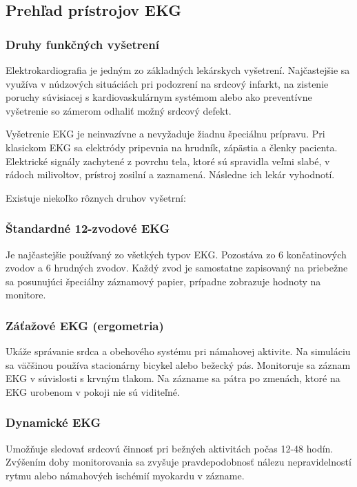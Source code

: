 \documentclass[titlepage]{article}
\begin{document}


\newpage 
\subsection{Prehľad prístrojov EKG}
\subsubsection{Druhy funkčných vyšetrení}
Elektrokardiografia je jedným zo základných lekárskych vyšetrení. Najčastejšie sa využíva v núdzových situáciách pri podozrení na srdcový infarkt, na zistenie poruchy súvisiacej s kardiovaskulárnym systémom alebo ako preventívne vyšetrenie so zámerom odhaliť možný srdcový defekt.

Vyšetrenie EKG je neinvazívne a nevyžaduje žiadnu špeciálnu prípravu. Pri klasickom EKG sa elektródy pripevnia na hrudník, zápästia a členky pacienta. Elektrické signály zachytené z povrchu tela, ktoré sú spravidla veľmi slabé, v rádoch milivoltov, prístroj zosilní a zaznamená. Následne ich lekár vyhodnotí.

Existuje niekoľko rôznych druhov vyšetrní:
\subsubsection*{Štandardné 12-zvodové EKG}
Je najčastejšie používaný zo všetkých typov EKG. Pozostáva zo 6 končatinových zvodov a 6 hrudných zvodov. Každý zvod je samostatne zapisovaný na priebežne sa posunujúci špeciálny záznamový papier, prípadne zobrazuje hodnoty na monitore.
\subsubsection*{Záťažové EKG (ergometria)}
Ukáže správanie srdca a obehového systému pri námahovej aktivite. Na simuláciu sa väčšinou používa stacionárny bicykel alebo bežecký pás. Monitoruje sa záznam EKG v súvislosti s krvným tlakom. Na zázname sa pátra po zmenách, ktoré na EKG urobenom v pokoji nie sú viditeľné.
\subsubsection*{Dynamické EKG}
Umožňuje sledovať srdcovú činnosť pri bežných aktivitách počas 12-48 hodín. Zvýšením doby monitorovania sa zvyšuje pravdepodobnosť nálezu nepravidelností rytmu alebo námahových ischémií myokardu v zázname.
\end{document}
